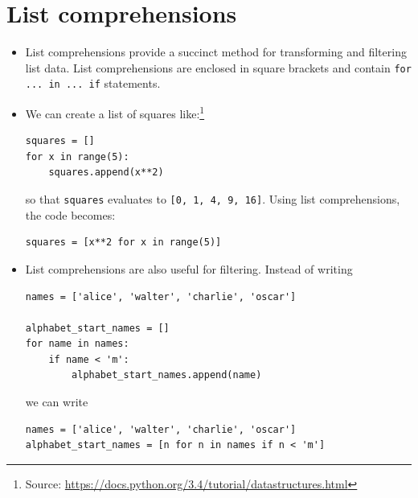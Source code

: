 \documentclass[a4paper,twoside,titlepage]{memoir}
\newcommand{\shellcmd}{\texttt}
\begin{document}
\section{List comprehensions}
\label{sec:list-comp}

\begin{itemize}
	\item List comprehensions provide a succinct method for transforming and filtering list data.  List comprehensions are enclosed in square brackets and contain \shellcmd{for ... in ... if} statements.

	\item We can create a list of squares like:\footnote{Source: \url{https://docs.python.org/3.4/tutorial/datastructures.html}}
\begin{verbatim}
squares = []
for x in range(5):
	squares.append(x**2)
\end{verbatim}
so that \shellcmd{squares} evaluates to \shellcmd{[0, 1, 4, 9, 16]}.  Using list comprehensions, the code becomes:
\begin{verbatim}
squares = [x**2 for x in range(5)]
\end{verbatim}

	\item List comprehensions are also useful for filtering.  Instead of writing
\begin{verbatim}
names = ['alice', 'walter', 'charlie', 'oscar']

alphabet_start_names = []
for name in names:
	if name < 'm':
		alphabet_start_names.append(name)
\end{verbatim}
we can write
\begin{verbatim}
names = ['alice', 'walter', 'charlie', 'oscar']
alphabet_start_names = [n for n in names if n < 'm']
\end{verbatim}
\end{itemize}
\end{document}
